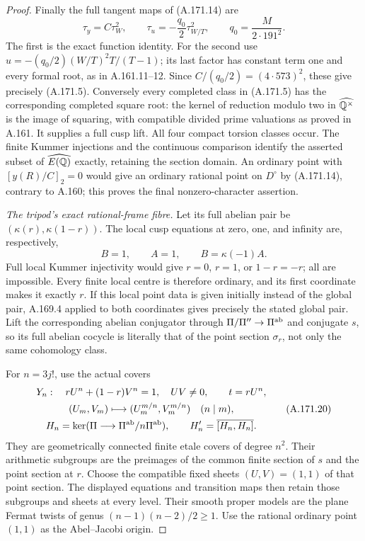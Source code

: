 \begin{proof}
Finally the full tangent maps of (A.171.14) are
\[
             \tau_y=C\tau_W^2,\qquad
             \tau_u=-\frac{q_0}{2}\tau_{W/T}^2,
               \qquad q_0=\frac{M}{2\cdot191^2}.
\tag{A.171.18}
\]
The first is the exact function identity.  For the second use
\(u=-(q_0/2)(W/T)^2T/(T-1)\); its last factor has constant
term one and every formal root, as in A.161.11--12.
Since \(C/(q_0/2)=(4\cdot573)^2\), these give precisely
(A.171.5).  Conversely every completed class in (A.171.5) has
the corresponding completed square root: the kernel of reduction
modulo two in \(\widehat{\mathbb Q^\times}\) is the image of
squaring, with compatible divided prime valuations as proved in
A.161.  It supplies a full cusp lift.  All four compact torsion
classes occur.  The finite Kummer injections and the continuous
comparison identify the asserted subset of
\(\widehat{E(\mathbb Q)}\) exactly, retaining the section domain.
An ordinary point with \([y(R)/C]_2=0\) would give an ordinary
rational point on \(D^\circ\) by (A.171.14), contrary to A.160;
this proves the final nonzero-character assertion.

\emph{The tripod's exact rational-frame fibre.}
Let its full abelian pair be \((\kappa(r),\kappa(1-r))\).
The local cusp equations at zero, one, and infinity are, respectively,
\[
                B=1,\qquad A=1,\qquad B=\kappa(-1)A.
\tag{A.171.19}
\]
Full local Kummer injectivity would give \(r=0\), \(r=1\),
or \(1-r=-r\); all are impossible.  Every finite local centre
is therefore ordinary, and its first coordinate makes it exactly
\(r\).  If this local point data is given initially instead of
the global pair, A.169.4 applied to both coordinates gives precisely
the stated global pair.
Lift the corresponding abelian conjugator through
\(\Pi/\Pi''\to\Pi^{\rm ab}\) and conjugate \(s\), so
its full abelian cocycle is literally that of the point section
\(\sigma_r\), not only the same cohomology class.

For \(n=3j!\), use the actual covers
\[
 \begin{gathered}
 Y_n:\quad rU^n+(1-r)V^n=1,\quad UV\ne0,\qquad t=rU^n,\\
 (U_m,V_m)\longmapsto(U_m^{m/n},V_m^{m/n})\quad(n\mid m),\\
 H_n=\ker(\Pi\longrightarrow\Pi^{\rm ab}/n\Pi^{\rm ab}),
                      \qquad H_n'=\overline{[H_n,H_n]}.
 \end{gathered}
\tag{A.171.20}
\]
They are geometrically connected finite etale covers of degree
\(n^2\).  Their arithmetic subgroups are the preimages of the
common finite section of \(s\) and the point section at \(r\).
Choose the compatible fixed sheets \((U,V)=(1,1)\) of that
point section.  The displayed equations and transition maps then
retain those subgroups and sheets at every level.  Their smooth
proper models are the plane Fermat twists of genus
\((n-1)(n-2)/2\geq1\).  Use the rational ordinary point
\((1,1)\) as the Abel--Jacobi origin.


\end{proof}
